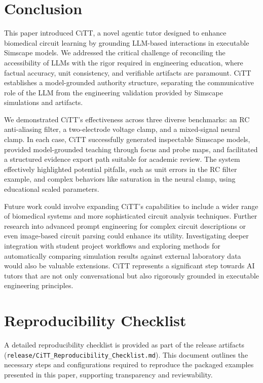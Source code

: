 \documentclass[10pt,twocolumn,letterpaper]{article}
\begin{document}
\section{Conclusion}
\label{sec:conclusion}
This paper introduced CiTT, a novel agentic tutor designed to enhance biomedical circuit learning by grounding LLM-based interactions in executable Simscape models. We addressed the critical challenge of reconciling the accessibility of LLMs with the rigor required in engineering education, where factual accuracy, unit consistency, and verifiable artifacts are paramount. CiTT establishes a model-grounded authority structure, separating the communicative role of the LLM from the engineering validation provided by Simscape simulations and artifacts.

We demonstrated CiTT's effectiveness across three diverse benchmarks: an RC anti-aliasing filter, a two-electrode voltage clamp, and a mixed-signal neural clamp. In each case, CiTT successfully generated inspectable Simscape models, provided model-grounded teaching through focus and probe maps, and facilitated a structured evidence export path suitable for academic review. The system effectively highlighted potential pitfalls, such as unit errors in the RC filter example, and complex behaviors like saturation in the neural clamp, using educational scaled parameters.

Future work could involve expanding CiTT's capabilities to include a wider range of biomedical systems and more sophisticated circuit analysis techniques. Further research into advanced prompt engineering for complex circuit descriptions or even image-based circuit parsing could enhance its utility. Investigating deeper integration with student project workflows and exploring methods for automatically comparing simulation results against external laboratory data would also be valuable extensions. CiTT represents a significant step towards AI tutors that are not only conversational but also rigorously grounded in executable engineering principles.

{
    \small
    
    
}

\appendix
\section{Reproducibility Checklist}
\label{sec:appendix_repro_checklist}
A detailed reproducibility checklist is provided as part of the release artifacts (\texttt{release/CiTT\_Reproducibility\_Checklist.md}). This document outlines the necessary steps and configurations required to reproduce the packaged examples presented in this paper, supporting transparency and reviewability.
\end{document}
